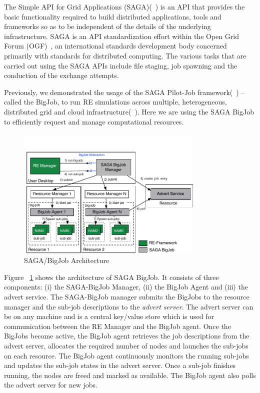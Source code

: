 \documentclass{rspublic}
\begin{document}
The Simple API for Grid Applications (SAGA)(~\citep{saga_gfd90}) is an API that provides the basic functionality required to build distributed applications, tools and frameworks so as to be independent of the details of the underlying infrastructure. SAGA is an API standardization effort within the Open Grid Forum (OGF)~\citep{ogf_web}, an international standards development body concerned primarily with standards for distributed computing. The various tasks that are carried out using the SAGA APIs include file staging, job spawning and the conduction of the exchange attempts.

Previously, we demonstrated the usage of the SAGA Pilot-Job framework(~\citep{saga_bigjob_condor_cloud}) -- called the BigJob, to run RE simulations across multiple, heterogeneous, distributed grid and cloud infrastructure(~\citep{Luckow:2008fp}). Here we are using the SAGA BigJob to efficiently request and manage computational resources. 

\begin{figure}[t]
      \centering
          \includegraphics[width=0.8\textwidth]{Bigjob_arch.pdf}
          \caption{\footnotesize SAGA/BigJob Architecture
              }
      \label{fig:bigjob}
\end{figure}

Figure ~\ref{fig:bigjob} shows the architecture of SAGA BigJob.
It consists of three components: (i) the SAGA-BigJob Manager, (ii) the BigJob Agent and (iii) the advert service. The SAGA-BigJob manager submits the BigJobs to the resource manager and the sub-job descriptions to the \emph{advert server}. The advert server can be on any machine and is a central key/value store which is used for communication between the RE Manager and the BigJob agent. Once the BigJobs become active, the BigJob agent retrieves the job descriptions from the advert server, allocates the required number of nodes and launches the sub-jobs on each resource. The BigJob agent continuously monitors the running sub-jobs and updates the sub-job states in the advert server. Once a sub-job finishes running, the nodes are freed and marked as available. The BigJob agent also polls the advert server for new jobs.
\end{document}
